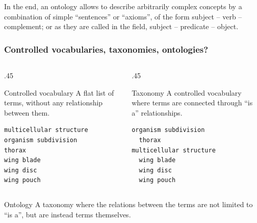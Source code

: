 \begin{frame}
{  In the end, an ontology allows to describe arbitrarily complex concepts by a
  combination of simple ``sentences'' or ``axioms'', of the form subject -- verb
  -- complement; or as they are called in the field, subject -- predicate --
  object.}
\end{frame}

\begin{frame}[fragile]
  \frametitle{Controlled vocabularies, taxonomies, ontologies?}

  \begin{columns}[t]
    \begin{column}{.45\textwidth}
      \begin{block}{Controlled vocabulary}
        A flat list of terms, without any relationship between them.

\begin{Verbatim}
multicellular structure
organism subdivision
thorax
wing blade
wing disc
wing pouch
\end{Verbatim}
      \end{block}
    \end{column}
    \begin{column}{.45\textwidth}
      \begin{block}{Taxonomy}
        A controlled vocabulary where terms are connected through ``is
        a'' relationships.

\begin{Verbatim}
organism subdivision
  thorax
multicellular structure
  wing blade
  wing disc
  wing pouch
\end{Verbatim}
      \end{block}
    \end{column}
  \end{columns}
  
  \begin{block}{Ontology}
    A taxonomy where the relations between the terms are not limited
    to ``is a'', but are instead terms themselves.
  \end{block}

\end{frame}
